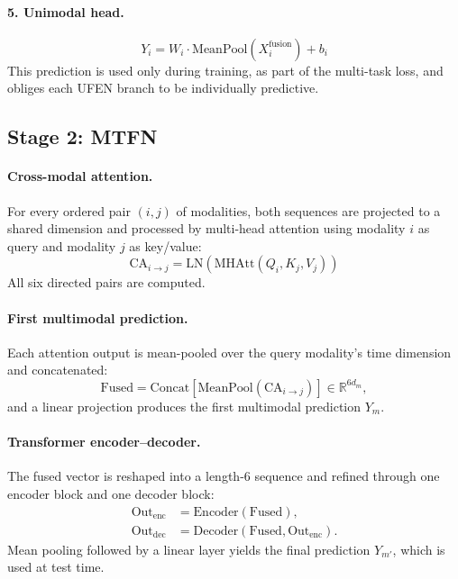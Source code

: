 \documentclass[11pt,twocolumn]{article}
\begin{document}
\paragraph{5. Unimodal head.}
\begin{equation}
Y_i = W_i \cdot \text{MeanPool}(X_i^{\text{fusion}}) + b_i
\end{equation}
This prediction is used only during training, as part of the multi-task loss, and obliges each UFEN branch to be individually predictive.

\subsection{Stage 2: MTFN}
\label{sec:mtfn}

\paragraph{Cross-modal attention.} For every ordered pair $(i, j)$ of modalities, both sequences are projected to a shared dimension and processed by multi-head attention using modality $i$ as query and modality $j$ as key/value:
\begin{equation}
\text{CA}_{i \to j} = \text{LN}\!\left(\text{MHAtt}(Q_i, K_j, V_j)\right)
\end{equation}
All six directed pairs are computed.

\paragraph{First multimodal prediction.} Each attention output is mean-pooled over the query modality's time dimension and concatenated:
\begin{equation}
\text{Fused} = \text{Concat}\!\left[\text{MeanPool}(\text{CA}_{i \to j})\right] \in \mathbb{R}^{6 d_m},
\end{equation}
and a linear projection produces the first multimodal prediction $Y_m$.

\paragraph{Transformer encoder--decoder.} The fused vector is reshaped into a length-6 sequence and refined through one encoder block and one decoder block:
\begin{align}
\text{Out}_{\text{enc}} &= \text{Encoder}(\text{Fused}), \\
\text{Out}_{\text{dec}} &= \text{Decoder}(\text{Fused}, \text{Out}_{\text{enc}}).
\end{align}
Mean pooling followed by a linear layer yields the final prediction $Y_{m'}$, which is used at test time.
\end{document}
